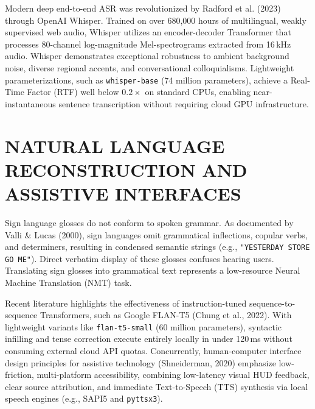 \documentclass[12pt,a4paper]{report}
\begin{document}
Modern deep end-to-end ASR was revolutionized by Radford et al. (2023) through OpenAI Whisper. Trained on over 680,000 hours of multilingual, weakly supervised web audio, Whisper utilizes an encoder-decoder Transformer that processes 80-channel log-magnitude Mel-spectrograms extracted from 16\,kHz audio. Whisper demonstrates exceptional robustness to ambient background noise, diverse regional accents, and conversational colloquialisms. Lightweight parameterizations, such as \texttt{whisper-base} (74 million parameters), achieve a Real-Time Factor (RTF) well below $0.2\times$ on standard CPUs, enabling near-instantaneous sentence transcription without requiring cloud GPU infrastructure.

\section{NATURAL LANGUAGE RECONSTRUCTION AND ASSISTIVE INTERFACES} \label{sec:lit-nlp}
Sign language glosses do not conform to spoken grammar. As documented by Valli \& Lucas (2000), sign languages omit grammatical inflections, copular verbs, and determiners, resulting in condensed semantic strings (e.g., \texttt{"YESTERDAY STORE GO ME"}). Direct verbatim display of these glosses confuses hearing users. Translating sign glosses into grammatical text represents a low-resource Neural Machine Translation (NMT) task. 

Recent literature highlights the effectiveness of instruction-tuned sequence-to-sequence Transformers, such as Google FLAN-T5 (Chung et al., 2022). With lightweight variants like \texttt{flan-t5-small} (60 million parameters), syntactic infilling and tense correction execute entirely locally in under 120\,ms without consuming external cloud API quotas. Concurrently, human-computer interface design principles for assistive technology (Shneiderman, 2020) emphasize low-friction, multi-platform accessibility, combining low-latency visual HUD feedback, clear source attribution, and immediate Text-to-Speech (TTS) synthesis via local speech engines (e.g., SAPI5 and \texttt{pyttsx3}).
\end{document}
